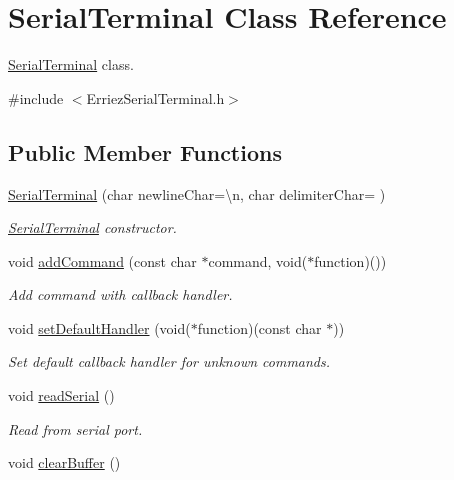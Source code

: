 \hypertarget{class_serial_terminal}{}\section{Serial\+Terminal Class Reference}
\label{class_serial_terminal}


\hyperlink{class_serial_terminal}{Serial\+Terminal} class.  




{\ttfamily \#include $<$Erriez\+Serial\+Terminal.\+h$>$}

\subsection*{Public Member Functions}
\begin{DoxyCompactItemize}
\item 
\hyperlink{class_serial_terminal_a47734b488aa72eda1db8ed0368c40637}{Serial\+Terminal} (char newline\+Char=\textquotesingle{}\textbackslash{}n\textquotesingle{}, char delimiter\+Char=\textquotesingle{} \textquotesingle{})
\begin{DoxyCompactList}\small\item\em \hyperlink{class_serial_terminal}{Serial\+Terminal} constructor. \end{DoxyCompactList}\item 
void \hyperlink{class_serial_terminal_acb854d20cab74a1d4c135d73e0b135d8}{add\+Command} (const char $\ast$command, void($\ast$function)())
\begin{DoxyCompactList}\small\item\em Add command with callback handler. \end{DoxyCompactList}\item 
void \hyperlink{class_serial_terminal_ad3f351057c3995e6542998b3a8d2f297}{set\+Default\+Handler} (void($\ast$function)(const char $\ast$))
\begin{DoxyCompactList}\small\item\em Set default callback handler for unknown commands. \end{DoxyCompactList}\item 
void \hyperlink{class_serial_terminal_a31fee26841e29f78f55482063ba404e9}{read\+Serial} ()
\begin{DoxyCompactList}\small\item\em Read from serial port. \end{DoxyCompactList}\item 
void \hyperlink{class_serial_terminal_aa65e3bff5be82b431e4b840ad9e6baf8}{clear\+Buffer} ()\hypertarget{class_serial_terminal_aa65e3bff5be82b431e4b840ad9e6baf8}{}\label{class_serial_terminal_aa65e3bff5be82b431e4b840ad9e6baf8}


\end{DoxyCompactItemize}
